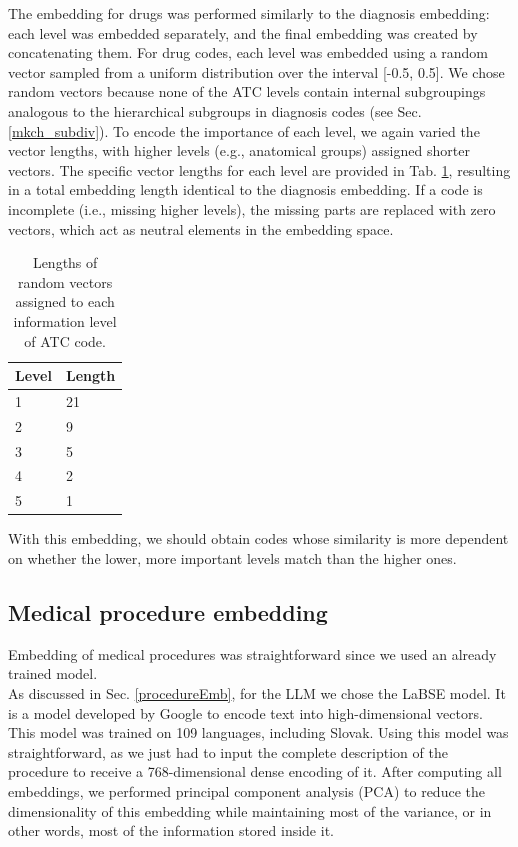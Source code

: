 The embedding for drugs was performed similarly to the diagnosis embedding: each level was embedded separately, and the final embedding was created by concatenating them. For drug codes, each level was embedded using a random vector sampled from a uniform distribution over the interval [-0.5, 0.5]. We chose random vectors because none of the ATC levels contain internal subgroupings analogous to the hierarchical subgroups in diagnosis codes (see Sec. \ref{mkch_subdiv}). To encode the importance of each level, we again varied the vector lengths, with higher levels (e.g., anatomical groups) assigned shorter vectors. The specific vector lengths for each level are provided in Tab. \ref{tab:drug_lev_len}, resulting in a total embedding length identical to the diagnosis embedding. If a code is incomplete (i.e., missing higher levels), the missing parts are replaced with zero vectors, which act as neutral elements in the embedding space.
\\

\begin{table}[!h]
	\centering
	\begin{tabular}{|l|l|}
		\hline
		Level  & Length \\ \hline
		1 & 21 \\ \hline
		2 & 9 \\ \hline
		3 & 5 \\ \hline
		4 & 2 \\ \hline
		5 & 1 \\ \hline
	\end{tabular}
	\caption{Lengths of random vectors assigned to each information level of ATC code.}
	\label{tab:drug_lev_len}
\end{table}  

With this embedding, we should obtain codes whose similarity is more dependent on whether the lower, more important levels match than the higher ones.

\subsection{Medical procedure embedding}

Embedding of medical procedures was straightforward since we used an already trained model.
\\

As discussed in Sec. \ref{procedureEmb}, for the LLM we chose the LaBSE model. It is a model developed by Google to encode text into high-dimensional vectors. This model was trained on 109 languages, including Slovak. Using this model was straightforward, as we just had to input the complete description of the procedure to receive a 768-dimensional dense encoding of it. After computing all embeddings, we performed principal component analysis (PCA) to reduce the dimensionality of this embedding while maintaining most of the variance, or in other words, most of the information stored inside it.
\\

